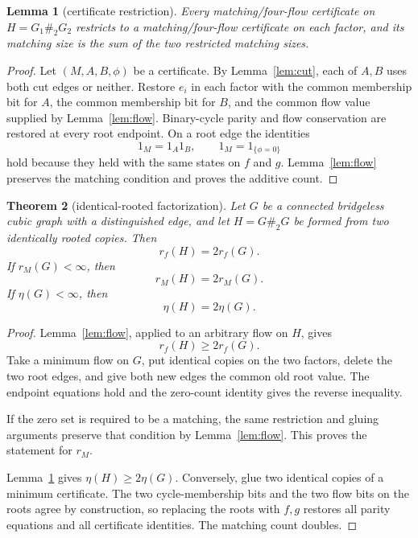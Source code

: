 \documentclass[11pt]{article}
\newtheorem{theorem}{Theorem}[section]
\newtheorem{lemma}[theorem]{Lemma}
\theoremstyle{definition}
\newcommand{\etaext}{\eta}
\begin{document}
\begin{lemma}[certificate restriction]
\label{lem:certificate}
Every matching/four-flow certificate on \(H=G_1\#_2G_2\) restricts to a
matching/four-flow certificate on each factor, and its matching size is
the sum of the two restricted matching sizes.
\end{lemma}

\begin{proof}
Let \((M,A,B,\phi)\) be a certificate.  By
Lemma~\ref{lem:cut}, each of \(A,B\) uses both cut edges or neither.
Restore \(e_i\) in each factor with the common membership bit for \(A\),
the common membership bit for \(B\), and the common flow value supplied
by Lemma~\ref{lem:flow}.  Binary-cycle parity and flow conservation are
restored at every root endpoint.  On a root edge the identities
\[
 1_M=1_A1_B,\qquad
 1_M=1_{\{\phi=0\}}
\]
hold because they held with the same states on \(f\) and \(g\).
Lemma~\ref{lem:flow} preserves the matching condition and proves the
additive count.
\end{proof}

\begin{theorem}[identical-rooted factorization]
\label{thm:factor}
Let \(G\) be a connected bridgeless cubic graph with a distinguished edge,
and let \(H=G\#_2G\) be formed from two identically rooted copies.  Then
\[
 r_f(H)=2r_f(G).
\]
If \(r_M(G)<\infty\), then
\[
 r_M(H)=2r_M(G).
\]
If \(\etaext(G)<\infty\), then
\[
 \etaext(H)=2\etaext(G).
\]
\end{theorem}

\begin{proof}
Lemma~\ref{lem:flow}, applied to an arbitrary flow on \(H\), gives
\[
 r_f(H)\ge2r_f(G).
\]
Take a minimum flow on \(G\), put identical copies on the two factors,
delete the two root edges, and give both new edges the common old root
value.  The endpoint equations hold and the zero-count identity gives
the reverse inequality.

If the zero set is required to be a matching, the same restriction and
gluing arguments preserve that condition by Lemma~\ref{lem:flow}.  This
proves the statement for \(r_M\).

Lemma~\ref{lem:certificate} gives
\(\etaext(H)\ge2\etaext(G)\).  Conversely, glue two identical copies of a
minimum certificate.  The two cycle-membership bits and the two flow bits
on the roots agree by construction, so replacing the roots with \(f,g\)
restores all parity equations and all certificate identities.  The
matching count doubles.
\end{proof}
\end{document}
